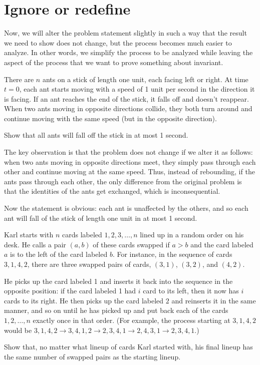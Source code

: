 \section{Ignore or redefine}

Now, we will alter the problem statement slightly in such a way that the result we need to show does not change, but the process becomes much easier to analyze. In other words, we simplify the process to be analyzed while leaving the aspect of the process that we want to prove something about invariant.

\begin{example}
    There are $n$ ants on a stick of length one unit, each facing left or right. At time $t = 0$, each ant starts moving with a speed of 1 unit per second in the direction it is facing. If an ant reaches the end of the stick, it falls off and doesn’t reappear. When two ants moving in opposite directions collide, they both turn around and continue moving with the same speed (but in the opposite direction).
    
    Show that all ants will fall off the stick in at most 1 second.
\end{example}

The key observation is that the problem does not change if we alter it as follows: when two ants moving in opposite directions meet, they simply pass through each other and continue moving at the same speed. Thus, instead of rebounding, if the ants pass through each other, the only difference from the original problem is that the identities of the ants get exchanged, which is inconsequential.

Now the statement is obvious: each ant is unaffected by the others, and so each ant will fall of the stick of length one unit in at most 1 second. 

\begin{example} [USAJMO 2018]
    Karl starts with $n$ cards labeled $1,2,3,\dots,n$ lined up in a random order on his desk. He calls a pair $(a,b)$ of these cards swapped if $a>b$ and the card labeled $a$ is to the left of the card labeled $b$. For instance, in the sequence of cards $3,1,4,2$, there are three swapped pairs of cards, $(3,1)$, $(3,2)$, and $(4,2)$.

    He picks up the card labeled 1 and inserts it back into the sequence in the opposite position: if the card labeled 1 had $i$ card to its left, then it now has $i$ cards to its right. He then picks up the card labeled $2$ and reinserts it in the same manner, and so on until he has picked up and put back each of the cards $1,2,\dots,n$ exactly once in that order. (For example, the process starting at $3,1,4,2$ would be $3,1,4,2\to 3,4,1,2\to 2,3,4,1\to 2,4,3,1\to 2,3,4,1$.)

    Show that, no matter what lineup of cards Karl started with, his final lineup has the same number of swapped pairs as the starting lineup.
\end{example}

